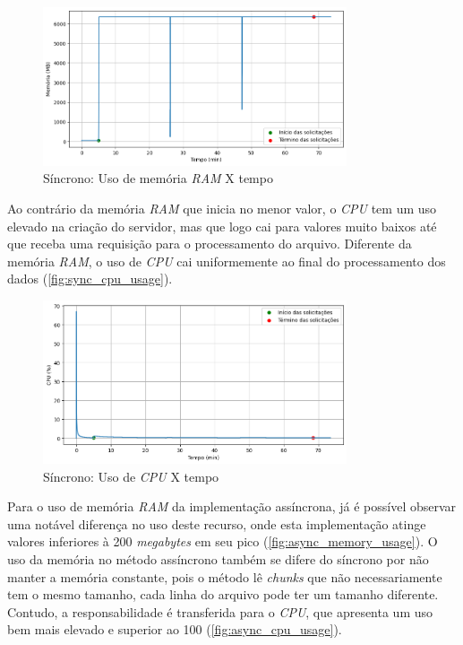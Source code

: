 \documentclass[12pt]{article}
\begin{document}
\begin{figure}[H]
\centering
\includegraphics[width=0.8\textwidth]{images/pt-br/results/sync_memory_usage.png}
\caption{Síncrono: Uso de memória \textit{RAM} X tempo}\label{fig:sync_memory_usage}
\end{figure}


Ao contrário da memória \textit{RAM} que inicia no menor valor, 
o \textit{CPU} tem um uso elevado na criação do servidor, mas que logo
cai para valores muito baixos até que receba uma requisição para o processamento do arquivo. 
Diferente da memória \textit{RAM}, o uso de \textit{CPU} cai uniformemente ao final 
do processamento dos dados (\autoref{fig:sync_cpu_usage}).


\begin{figure}[H]
\centering
\includegraphics[width=0.8\textwidth]{images/pt-br/results/sync_cpu_usage.png}
\caption{Síncrono: Uso de \textit{CPU} X tempo}\label{fig:sync_cpu_usage}
\end{figure}


Para o uso de memória \textit{RAM} da implementação assíncrona, já é possível
observar uma notável diferença no uso deste recurso, onde esta implementação 
atinge valores inferiores à 200 \textit{megabytes} em seu pico
(\autoref{fig:async_memory_usage}). O uso da memória no método assíncrono também se
difere do síncrono por não manter a memória constante, pois o método lê \textit{chunks}
que não necessariamente tem o mesmo tamanho, cada linha do arquivo pode ter um
tamanho diferente. Contudo, a responsabilidade é transferida para o \textit{CPU},
que apresenta um uso bem mais elevado e superior ao 100\text{\%} (\autoref{fig:async_cpu_usage}).
\end{document}
